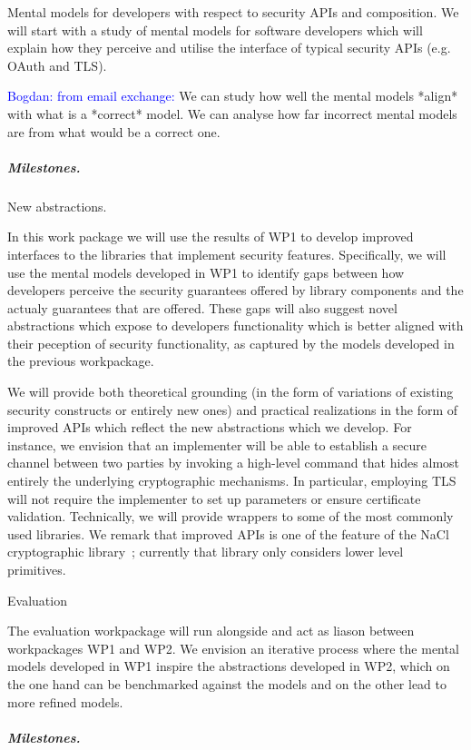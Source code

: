 \documentclass[10pt]{article}
\newcommand{\bw}[1]{{\textcolor{blue} {Bogdan: #1}}}
\begin{document}
\begin{description}\itemsep-3pt
\item[WP 1] Mental models for developers with respect to security APIs and composition. 
We will start with a study of mental models for software developers which will explain how they perceive and utilise the interface of typical security APIs (e.g. OAuth and TLS). 

\bw{from email exchange:}
We can study how well the mental models *align* with what is a *correct* model.   We can analyse how far incorrect mental models are from what would be a correct one. 

\subparagraph{Milestones.} 

\item[WP 2] New abstractions. 

In this work package we will use the results of WP1 to develop improved interfaces to the libraries that implement security features. 
Specifically, we will use the mental models developed in WP1 to identify gaps between how developers perceive the security guarantees offered by library components and the actualy guarantees that are offered. 
These gaps will also suggest novel abstractions which expose to developers functionality which is better aligned with their peception of security functionality, as captured by the models developed in the previous workpackage. 

We will provide both theoretical grounding (in the form of variations of existing security constructs or entirely new ones) and practical realizations in the form of improved APIs which reflect the new abstractions which we develop.  For instance, we envision that an implementer will be able to establish a secure channel between two parties by invoking a high-level command that hides almost entirely the underlying cryptographic mechanisms.  
In particular, employing TLS will not require the implementer to set up parameters or ensure certificate validation.  
Technically, we will provide wrappers to some of the most commonly used libraries.  
We remark that improved APIs is one of the feature of the NaCl cryptographic library~\cite{bernstein}; currently that library only considers lower level primitives.  
\item[WP 3] Evaluation

The evaluation workpackage will run alongside and act as liason between workpackages WP1 and WP2.  
We envision an iterative process where the mental models developed in WP1 inspire the abstractions developed in WP2, which on the one hand can be benchmarked against the models and on the other lead to more refined models. 

\vspace{-\baselineskip}
\subparagraph{Milestones.}


\end{description}
\end{document}
